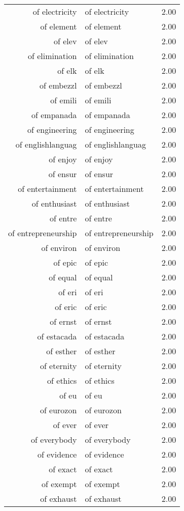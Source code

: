 \begin{table}[ht]
\begin{tabular}{rlr}
  of electricity & of electricity & 2.00 \\ 
  of element & of element & 2.00 \\ 
  of elev & of elev & 2.00 \\ 
  of elimination & of elimination & 2.00 \\ 
  of elk & of elk & 2.00 \\ 
  of embezzl & of embezzl & 2.00 \\ 
  of emili & of emili & 2.00 \\ 
  of empanada & of empanada & 2.00 \\ 
  of engineering & of engineering & 2.00 \\ 
  of englishlanguag & of englishlanguag & 2.00 \\ 
  of enjoy & of enjoy & 2.00 \\ 
  of ensur & of ensur & 2.00 \\ 
  of entertainment & of entertainment & 2.00 \\ 
  of enthusiast & of enthusiast & 2.00 \\ 
  of entre & of entre & 2.00 \\ 
  of entrepreneurship & of entrepreneurship & 2.00 \\ 
  of environ & of environ & 2.00 \\ 
  of epic & of epic & 2.00 \\ 
  of equal & of equal & 2.00 \\ 
  of eri & of eri & 2.00 \\ 
  of eric & of eric & 2.00 \\ 
  of ernst & of ernst & 2.00 \\ 
  of estacada & of estacada & 2.00 \\ 
  of esther & of esther & 2.00 \\ 
  of eternity & of eternity & 2.00 \\ 
  of ethics & of ethics & 2.00 \\ 
  of eu & of eu & 2.00 \\ 
  of eurozon & of eurozon & 2.00 \\ 
  of ever & of ever & 2.00 \\ 
  of everybody & of everybody & 2.00 \\ 
  of evidence & of evidence & 2.00 \\ 
  of exact & of exact & 2.00 \\ 
  of exempt & of exempt & 2.00 \\ 
  of exhaust & of exhaust & 2.00 \\ 

\end{tabular}
\end{table}
